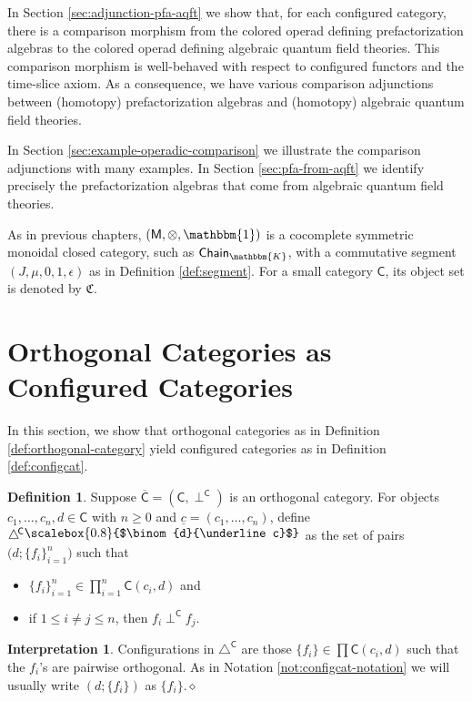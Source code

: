 \documentclass[11pt]{amsbook}
\numberwithin{section}{chapter}
\numberwithin{subsection}{section}
\numberwithin{equation}{section}
\theoremstyle{plain}
\theoremstyle{definition}
\newtheorem{definition}[equation]{Definition}
\newtheorem{interpretation}[equation]{Interpretation}
\newcommand{\fieldk}{\mathbbm{K}}
\newcommand{\colorc}{\mathfrak{C}}
\newcommand{\C}{\mathsf{C}}
\newcommand{\M}{\mathsf{M}}
\newcommand{\tensorunit}{\mathbbm{1}}
\newcommand{\dqed}{\hfill$\diamond$}
\newcommand{\Config}{\triangle} %
\newcommand{\Configc}{\Config^{\!\C}}
\newcommand{\perpc}{\perp^{\C}}
\newcommand{\Cbar}{\overline{\C}}
\newcommand{\Chaink}{\mathsf{Chain}_{\fieldk}}
\newcommand{\uc}{\underline c}
\newcommand{\smallprof}[1]
{\raisebox{.05cm}{\scalebox{0.8}{#1}}}
\newcommand{\duc}{\smallprof{$\binom{d}{\uc}$}}
\begin{document}
In Section \ref{sec:adjunction-pfa-aqft} we show that, for each configured category, there is a comparison morphism from the colored operad defining prefactorization algebras to the colored operad defining algebraic quantum field theories.  This comparison morphism is well-behaved with respect to configured functors and the time-slice axiom.  As a consequence, we have various comparison adjunctions between (homotopy) prefactorization algebras and (homotopy) algebraic quantum field theories.

In Section \ref{sec:example-operadic-comparison} we illustrate the comparison adjunctions with many examples.  In Section \ref{sec:pfa-from-aqft} we identify precisely the prefactorization algebras that come from algebraic quantum field theories.

As in previous chapters, $(\M,\otimes,\tensorunit)$ is a cocomplete symmetric monoidal closed category, such as $\Chaink$, with a commutative segment $(J,\mu,0,1,\epsilon)$ as in Definition \ref{def:segment}.  For a small category $\C$, its object set is denoted by $\colorc$.


\section{Orthogonal Categories as Configured Categories}\label{sec:relation-orthcat}

In this section, we show that orthogonal categories as in Definition \ref{def:orthogonal-category} yield configured categories as in Definition \ref{def:configcat}.

\begin{definition}\label{def:orthcat-to-confcat}
Suppose $\Cbar = (\C,\perpc)$ is an orthogonal category.  For objects $c_1,\ldots,c_n,d\in \C$ with $n \geq 0$ and $\uc = (c_1,\ldots,c_n)$, define $\Configc\duc$ as the set of pairs $\bigl(d;\{f_i\}_{i=1}^n\bigr)$ such that
\begin{itemize}\item $\{f_i\}_{i=1}^n \in \prod_{i=1}^n \C(c_i,d)$ and
\item if $1 \leq i \not=j \leq n$, then $f_i \perpc f_j$.
\end{itemize}
\end{definition}

\begin{interpretation} Configurations in $\Configc$ are those $\{f_i\} \in \prod\C(c_i,d)$ such that the $f_i$'s are pairwise orthogonal.  As in Notation \ref{not:configcat-notation} we will usually write $(d;\{f_i\})$ as $\{f_i\}$.\dqed\end{interpretation}
\end{document}
